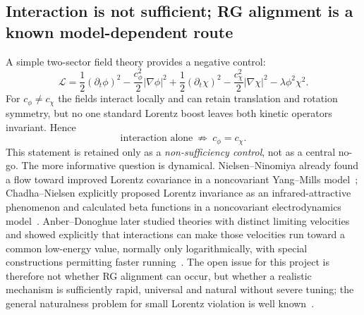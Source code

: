\documentclass[11pt,a4paper]{article}
\begin{document}
\subsection{Interaction is not sufficient; RG alignment is a known model-dependent route}
A simple two-sector field theory provides a negative control:
\begin{equation}
 \mathcal L=\frac12(\partial_t\phi)^2-\frac{c_\phi^2}{2}|\nabla\phi|^2
 +\frac12(\partial_t\chi)^2-\frac{c_\chi^2}{2}|\nabla\chi|^2
 -\lambda\phi^2\chi^2.
\end{equation}
For $c_\phi\neq c_\chi$ the fields interact locally and can retain translation and rotation symmetry, but no one standard Lorentz boost leaves both kinetic operators invariant.  Hence
\begin{equation}
 \boxed{\text{interaction alone}\ \not\Rightarrow\ c_\phi=c_\chi.}
\end{equation}
This statement is retained only as a \emph{non-sufficiency control}, not as a central no-go.  The more informative question is dynamical.  Nielsen--Ninomiya already found a flow toward improved Lorentz covariance in a noncovariant Yang--Mills model~\cite{nielsen1978}; Chadha--Nielsen explicitly proposed Lorentz invariance as an infrared-attractive phenomenon and calculated beta functions in a noncovariant electrodynamics model~\cite{chadha1983}.  Anber--Donoghue later studied theories with distinct limiting velocities and showed explicitly that interactions can make those velocities run toward a common low-energy value, normally only logarithmically, with special constructions permitting faster running~\cite{anber2011,anber2011running}.  The open issue for this project is therefore not whether RG alignment can occur, but whether a realistic mechanism is sufficiently rapid, universal and natural without severe tuning; the general naturalness problem for small Lorentz violation is well known~\cite{collins2004}.
\end{document}
